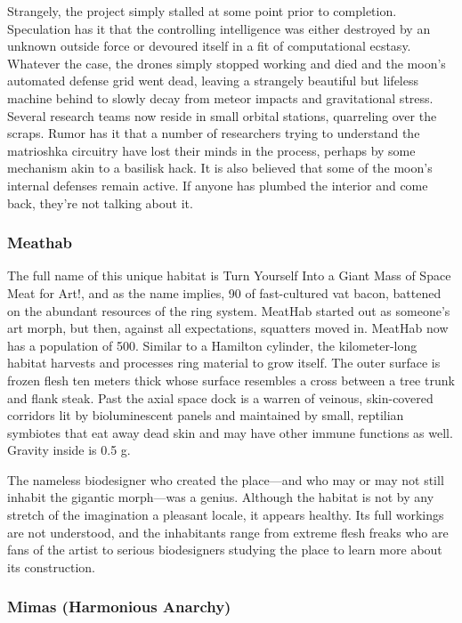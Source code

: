 Strangely, the project simply stalled at some point 
prior to completion. Speculation has it that the 
controlling intelligence was either destroyed by an 
unknown outside force or devoured itself in a fit of 
computational ecstasy. Whatever the case, the drones 
simply stopped working and died and the moon's automated
defense grid went dead, leaving a strangely
beautiful but lifeless machine behind to slowly decay 
from meteor impacts and gravitational stress. Several 
research teams now reside in small orbital stations, 
quarreling over the scraps. Rumor has it that a 
number of researchers trying to understand the matrioshka
circuitry have lost their minds in the process,
perhaps by some mechanism akin to a basilisk hack. 
It is also believed that some of the moon's internal 
defenses remain active. If anyone has plumbed the 
interior and come back, they're not talking about it.

\subsubsection{Meathab}

The full name of this unique habitat is Turn Yourself 
Into a Giant Mass of Space Meat for Art!, and as the 
name implies, 90%
of fast-cultured vat bacon, battened on the abundant
resources of the ring system. MeatHab started
out as someone's art morph, but then, against all 
expectations, squatters moved in. MeatHab now has 
a population of 500. Similar to a Hamilton cylinder, 
the kilometer-long habitat harvests and processes ring 
material to grow itself. The outer surface is frozen 
flesh ten meters thick whose surface resembles a cross 
between a tree trunk and flank steak. Past the axial 
space dock is a warren of veinous, skin-covered corridors
lit by bioluminescent panels and maintained by
small, reptilian symbiotes that eat away dead skin and 
may have other immune functions as well. Gravity 
inside is 0.5 g.

The nameless biodesigner who created the 
place—and who may or may not still inhabit the 
gigantic morph—was a genius. Although the habitat 
is not by any stretch of the imagination a pleasant
locale, it appears healthy. Its full workings are
not understood, and the inhabitants range from 
extreme flesh freaks who are fans of the artist to serious
biodesigners studying the place to learn more
about its construction.

\subsubsection{Mimas (Harmonious Anarchy)}

